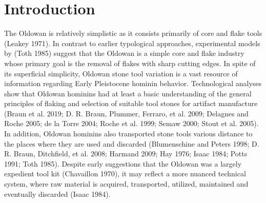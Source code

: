 \documentclass[]{elsarticle} %
\begin{document}
\doublespacing
\pagebreak
\linenumbers

\doublespacing

\hypertarget{introduction}{%
\section{Introduction}\label{introduction}}

The Oldowan is relatively simplistic as it consists primarily of core
and flake tools (Leakey 1971). In contrast to earlier typological
approaches, experimental models by (Toth 1985) suggest that the Oldowan
is a simple core and flake industry whose primary goal is the removal of
flakes with sharp cutting edges. In spite of its superficial simplicity,
Oldowan stone tool variation is a vast resource of information regarding
Early Pleistocene hominin behavior. Technological analyses show that
Oldowan hominins had at least a basic understanding of the general
principles of flaking and selection of suitable tool stones for artifact
manufacture (Braun et al. 2019; D. R. Braun, Plummer, Ferraro, et al.
2009; Delagnes and Roche 2005; de la Torre 2004; Roche et al. 1999;
Semaw 2000; Stout et al. 2005). In addition, Oldowan hominins also
transported stone tools various distance to the places where they are
used and discarded (Blumenschine and Peters 1998; D. R. Braun,
Ditchfield, et al. 2008; Harmand 2009; Hay 1976; Isaac 1984; Potts 1991;
Toth 1985). Despite early suggestions that the Oldowan was a largely
expedient tool kit (Chavaillon 1970), it may reflect a more nuanced
technical system, where raw material is acquired, transported, utilized,
maintained and eventually discarded (Isaac 1984).
\end{document}
